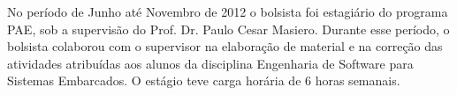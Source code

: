 No período de Junho até Novembro de 2012 o bolsista foi estagiário do programa PAE, sob a supervisão do Prof. Dr. Paulo Cesar Masiero. Durante esse período, o bolsista colaborou com o supervisor na elaboração de material e na correção das atividades atribuídas aos alunos da disciplina Engenharia de Software para Sistemas Embarcados. O estágio teve carga horária de 6 horas semanais.